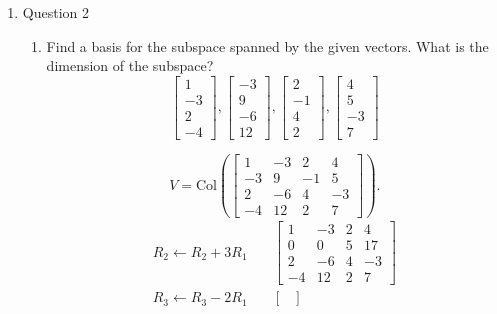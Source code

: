 \documentclass{zc-ust-hw}
\begin{document}
\begin{enumerate}
  \item Question 2
    \begin{enumerate}
      \item Find a basis for the subspace spanned by the given vectors. What is
        the dimension of the subspace? 
    \begin{equation*}
      \begin{bmatrix} 1\\-3\\2\\-4 \end{bmatrix},
      \begin{bmatrix} -3\\9\\-6\\12 \end{bmatrix},
      \begin{bmatrix} 2\\-1\\4\\2 \end{bmatrix},
      \begin{bmatrix} 4\\5\\-3\\7 \end{bmatrix}
    \end{equation*}
    \begin{sol}
      \begin{equation}
        V = \text{Col}\left(
        \begin{bmatrix} 
          1 & -3 & 2 & 4\\
          -3 & 9 & -1 & 5\\
          2 & -6 & 4 & -3\\
          -4 & 12 & 2 & 7
        \end{bmatrix} 
        \right)
      .\end{equation}
      \begin{align}
        R_2 \leftarrow R_2 + 3R_1
        &\quad
        \begin{bmatrix} 
          1 & -3 & 2 & 4\\
          0 & 0 & 5 & 17\\
          2 & -6 & 4 & -3\\
          -4 & 12 & 2 & 7
        \end{bmatrix} \\
        R_3 \leftarrow R_3 - 2R_1
        &\quad
        \begin{bmatrix} 

\end{bmatrix}
\end{align}
\end{sol}
\end{enumerate}
\end{enumerate}
\end{document}
